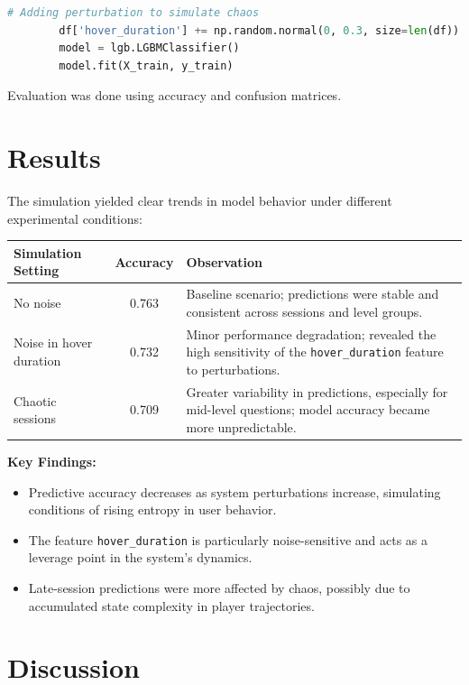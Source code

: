 \documentclass[12pt]{article}
\begin{document}
	\begin{lstlisting}[language=Python, caption=Injecting Perturbations, basicstyle=\ttfamily\small]
		# Adding perturbation to simulate chaos
		df['hover_duration'] += np.random.normal(0, 0.3, size=len(df))
		model = lgb.LGBMClassifier()
		model.fit(X_train, y_train)
	\end{lstlisting}
	
	\noindent Evaluation was done using accuracy and confusion matrices.
	
\section{Results}

The simulation yielded clear trends in model behavior under different experimental conditions:

\begin{longtable}{|l|c|p{8cm}|}
	\hline
	\textbf{Simulation Setting} & \textbf{Accuracy} & \textbf{Observation} \\
	\hline
	No noise & 0.763 & Baseline scenario; predictions were stable and consistent across sessions and level groups. \\
	Noise in hover duration & 0.732 & Minor performance degradation; revealed the high sensitivity of the \texttt{hover\_duration} feature to perturbations. \\
	Chaotic sessions & 0.709 & Greater variability in predictions, especially for mid-level questions; model accuracy became more unpredictable. \\
	\hline
\end{longtable}

\noindent \textbf{Key Findings:}
\begin{itemize}
	\item Predictive accuracy decreases as system perturbations increase, simulating conditions of rising entropy in user behavior.
	\item The feature \texttt{hover\_duration} is particularly noise-sensitive and acts as a leverage point in the system's dynamics.
	\item Late-session predictions were more affected by chaos, possibly due to accumulated state complexity in player trajectories.
\end{itemize}
	
\section{Discussion}
\end{document}

